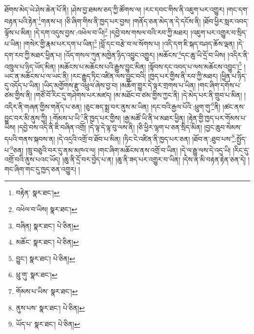 ཐོགས་མེད་ཡེ་ཤེས་ཆེན་པོ་ནི། །ཤེས་བྱ་ཐམས་ཅད་ཀྱི་ཚོགས་ལ། །རང་དབང་གིས་ནི་འཇུག་པར་འགྱུར། །གང་དག་བརྟན་པའི་རྟེན་\footnote{བརྟེན་  སྣར་ཐང་། }གནས་པ། །ཅི་ཞིག་གིས་ནི་ཁྱད་པར་བྱས། །གནོད་ཅན་མེད་ན་དེ་དངོས་ནི། །ཐོབ་ཕྱིར་སླར་འབད་ལྟོས་པ་མིན། །དེ་དག་འདུས་བྱས་:འཕེལ་བ་ཡི།\footnote{འཕེལ་བ་ཡིས།  སྣར་ཐང་། } །དབྱེ་བས་གསལ་བའི་རབ་ཀྱི་མཐར། །འཇུག་པར་འགྱུར་བ་སྲིད་པ་ཡིན། །གསེར་གྱི་རྣམ་པར་དག་པ་ཡིན།\footnote{བཞིན།  སྣར་ཐང་།  པེ་ཅིན། } །བློ་དང་བརྩེ་བ་ལ་སོགས་པ། །འདི་དག་ཇི་སྐད་བཤད་ཆོས་ལྡན། །དེ་དག་རབ་ཀྱི་མཐར་ཕྱིན་པ། །འོད་གསལ་ཀུན་མཁྱེན་ཉིད་འབྱུང་འགྱུར། །མཆོངས་\footnote{མཆོང་  སྣར་ཐང་།  པེ་ཅིན། }དང་ཆུ་ཡི་དྲོ་བ་ཡིས། །འདིར་ནི་འཁྲུལ་པ་ཉིད་ཡོད་མིན། །མཆོངས་པ་མཆོངས་པའི་རྒྱུས་བྱུང་མིན། །སྟོབས་དང་འབད་པ་ལས་མཆོངས་འབྱུང་།\footnote{བྱུང་།  སྣར་ཐང་།  པེ་ཅིན། } །ཡང་ན་མཆོངས་པ་ལ་ཡང་ནི། །རང་རྒྱུད་ཏིང་འཛིན་ལས་བྱུང་བའི། །ཁྱད་པར་གྱིས་ནི་རབ་ཀྱི་མཐར། །ཕྱིན་པ་ཉིད་དུ་འདོད་པ་ཡིན། །ཡིད་མགྱོགས་རྫུ་འཕྲུལ་ཞེས་བྱ་བ། །མཆོག་གྱུར་དེ་ལྟར་གྲགས་པ་ཡིན། །གང་ཞིག་དགོས་པ་ཙམ་གྱིས་ནི། །གཙོ་བོ་རིང་དུ་གཤེགས་པར་མཛད། །མ་མཐོང་བ་ཙམ་གྱིས་ཀྱང་ནི། །དེ་མེད་པར་ནི་གྲུབ་པ་མིན། །འདིར་ནི་གཞན་གྱིས་གནོད་པ་ཅན། །ཅུང་ཟད་སྨྲ་བར་ནུས་མ་ཡིན། །དང་བའི་རྒྱལ་པོའི་:ཕྲུག་གུ་\footnote{ཕྲུ་གུ་  སྣར་ཐང་། }ནི། །ཚང་ནས་བྱུང་བར་མི་ནུས་ཀྱི། །:གོམས་པ་ཡི་\footnote{གོམས་པ་ཡིས་  སྣར་ཐང་། }ནི་ཁྱད་པར་གྱིས། །རྒྱ་མཚོ་ཡི་ནི་ཕ་མཐར་ཕྱིན། །རྟེན་གྱི་ཁྱད་པར་གོམས་པ་ཡིས། །དབྱེ་བས་འདི་ནི་ཇི་བཞིན་འགྲོ། །དེ་ལྟ་དེ་ལྟ་བུ་ལས་ནི། །ཅི་ཕྱིར་ལྷག་པ་ཅན་སྲིད་མིན། །བྱང་ཆུབ་སེམས་དཔའི་གནས་སྐབས་ན། །དེ་འདྲའི་འགྲོ་བ་ཐོབ་པ་མིན། །ཏིང་ངེ་འཛིན་ནི་ཁྱད་པར་ཅན། །ཐོབ་ན་:ཐུབ་པས་\footnote{ནུས་པས་  སྣར་ཐང་།  པེ་ཅིན། }:སྤྱོད་པ་\footnote{ཡོད་པ་  སྣར་ཐང་།  པེ་ཅིན། }ཅན། །ཁྲུ་བཅུའི་བར་དུ་ནམ་མཁའ་ལ། །གང་ཞིག་མཆོངས་ནས་འགྲོ་བ་ཡིན། །དེ་ལ་རྒྱུ་ལས་དེ་འདྲ་ཡི། །རིང་དུ་འགྲོ་བའི་ནུས་པའང་ཡོད། །ཆུ་ནི་དྲོ་བར་བྱེད་པ་ན། །ཆུ་ནི་ཟད་པར་འགྱུར་བ་ཡིན། །དེས་ན་མི་བརྟན་རྟེན་ཅན་དེ། །གང་ཞིག་གང་དུ་ཁྱད་ཅན་འགྱུར། །
